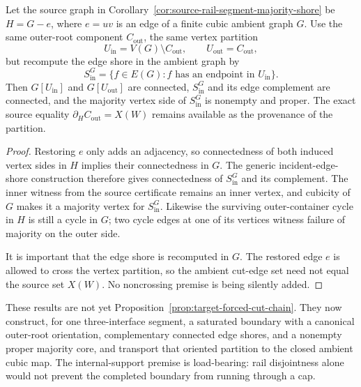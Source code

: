 \begin{corollary}
\label{cor:source-rail-segment-ambient-majority-shore}
Let the source graph in Corollary~\ref{cor:source-rail-segment-majority-shore}
be $H=G-e$, where $e=uv$ is an edge of a finite cubic ambient graph
$G$.  Use the same outer-root component $C_{\mathrm{out}}$, the same
vertex partition
\[
 U_{\mathrm{in}}=V(G)\setminus C_{\mathrm{out}},
 \qquad U_{\mathrm{out}}=C_{\mathrm{out}},
\]
but recompute the edge shore in the ambient graph by
\[
 S^G_{\mathrm{in}}
   =\{f\in E(G): f\text{ has an endpoint in }U_{\mathrm{in}}\}.
\]
Then $G[U_{\mathrm{in}}]$ and $G[U_{\mathrm{out}}]$ are connected,
$S^G_{\mathrm{in}}$ and its edge complement are connected, and the
majority vertex side of $S^G_{\mathrm{in}}$ is nonempty and proper.
The exact source equality
$\partial_H C_{\mathrm{out}}=X(W)$ remains available as the provenance of
the partition.
\end{corollary}

\begin{proof}
Restoring $e$ only adds an adjacency, so connectedness of both induced
vertex sides in $H$ implies their connectedness in $G$.  The generic
incident-edge-shore construction therefore gives connectedness of
$S^G_{\mathrm{in}}$ and its complement.  The inner witness from the source
certificate remains an inner vertex, and cubicity of $G$ makes it a
majority vertex for $S^G_{\mathrm{in}}$.  Likewise the surviving
outer-container cycle in $H$ is still a cycle in $G$; two cycle edges at
one of its vertices witness failure of majority on the outer side.

It is important that the edge shore is recomputed in $G$.  The restored
edge $e$ is allowed to cross the vertex partition, so the ambient cut-edge
set need not equal the source set $X(W)$.  No noncrossing premise is being
silently added.
\end{proof}

These results are not yet Proposition~\ref{prop:target-forced-cut-chain}.
They now construct, for one three-interface segment, a saturated boundary with a
canonical outer-root orientation, complementary connected edge shores, and a
nonempty proper majority core, and transport that oriented partition to the
closed ambient cubic map.  The internal-support premise is load-bearing:
rail disjointness alone would not prevent the completed boundary from running
through a cap.

